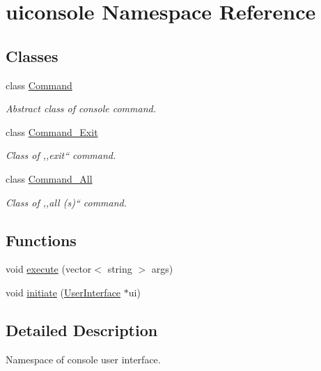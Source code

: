 \hypertarget{namespaceuiconsole}{
\section{uiconsole Namespace Reference}
\label{da/de1/namespaceuiconsole}
}
\subsection*{Classes}
\begin{DoxyCompactItemize}
\item 
class \hyperlink{classuiconsole_1_1Command}{Command}
\begin{DoxyCompactList}\small\item\em Abstract class of console command. \item\end{DoxyCompactList}\item 
class \hyperlink{classuiconsole_1_1Command__Exit}{Command\_\-Exit}
\begin{DoxyCompactList}\small\item\em Class of ,,exit`` command. \item\end{DoxyCompactList}\item 
class \hyperlink{classuiconsole_1_1Command__All}{Command\_\-All}
\begin{DoxyCompactList}\small\item\em Class of ,,all (s)`` command. \item\end{DoxyCompactList}\end{DoxyCompactItemize}
\subsection*{Functions}
\begin{DoxyCompactItemize}
\item 
void \hyperlink{namespaceuiconsole_a40263e63a42257769b2fb9a95fd771c1}{execute} (vector$<$ string $>$ args)
\item 
void \hyperlink{namespaceuiconsole_a037fc32900a055adc36892666b385f30}{initiate} (\hyperlink{classUserInterface}{UserInterface} $\ast$ui)
\end{DoxyCompactItemize}


\subsection{Detailed Description}
Namespace of console user interface. 

